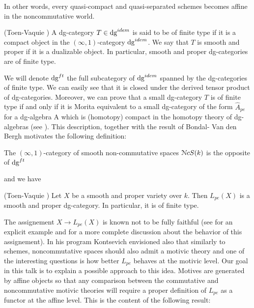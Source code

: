 \begin{refsection}
In other words, every quasi-compact and quasi-separated schemes becomes affine in the noncommutative world.

\begin{defn}(Toen-Vaquie \cite{toen-vaquie})
A dg-category $T\in \mathrm{dg}^{idem}$ is said to be of finite type if it is a compact object in the $(\infty,1)$-category $\mathrm{dg}^{idem}$.  We say that $T$ is smooth and proper if it is a dualizable object. In particular, smooth and proper dg-categories are of finite type. 
\end{defn}

We will denote $\mathrm{dg}^{ft}$ the full subcategory of $\mathrm{dg}^{idem}$ spanned by the dg-categories of finite type. We can easily see that it is closed under the derived tensor product of dg-categories. Moreover, we can prove that a small dg-category $T$ is of finite type if and only if it is Morita equivalent to a small dg-category of the form $\widehat{A}_{pe}$ for a dg-algebra A which is (homotopy) compact in the homotopy theory of dg-algebras (see \cite{toen-vaquie}). This description, together with the result of Bondal- Van den Bergh motivates the following definition:

\begin{defn}
The $(\infty,1)$-category of smooth non-commutative spaces $\mathcal{N}cS(k)$ is the opposite of $\mathrm{dg}^{ft}$
\end{defn}

\noindent and we have

\begin{prop}(Toen-Vaquie \cite[3.27]{toen-vaquie})
Let $X$ be a smooth and proper variety over $k$. Then $L_{pe}(X)$ is a smooth and proper dg-category. In particular, it is of finite type.
\end{prop}

The assignement $X\to L_{pe}(X)$ is known not to be fully faithful (see \cite{MR2067481} for an explicit example and \cite{MR2296422} for a more complete discussion about the behavior of this assignement). In his program \cite{kontsevich1, kontsevich2} Kontsevich envisioned also that similarly to schemes, noncommutative spaces should also admit a motivic theory and one of the interesting questions is how better $L_{pe}$ behaves at the motivic level. Our goal in this talk is to explain a possible approach to this idea. Motives are generated by affine objects so that any comparison between the commutative and noncommutative motivic theories will require a proper definition of $L_{pe}$ as a functor at the affine level. This is the content of the following result:


\end{refsection}
